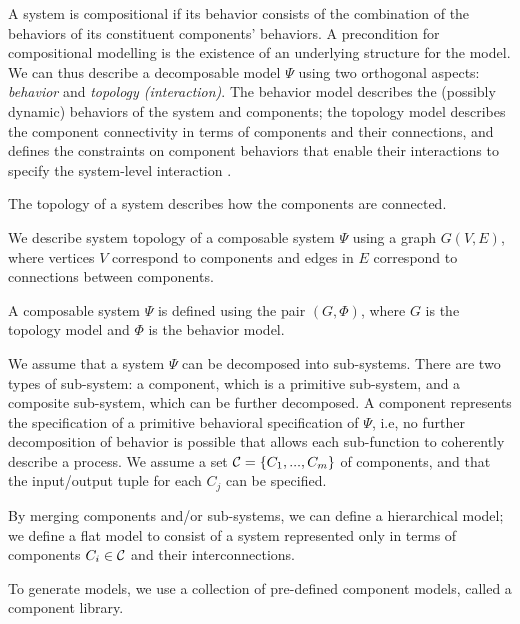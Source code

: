 A system is compositional if its behavior consists of the combination
of the behaviors of its constituent components' behaviors. A
precondition for compositional modelling is the existence of an
underlying structure for the model.  We can thus describe a
decomposable model $\Psi$ using two orthogonal aspects: {\em behavior}
and {\em topology (interaction)}. The behavior model describes the
(possibly dynamic) behaviors of the system and components; the
topology model describes the component connectivity in terms of
components and their connections, and defines the constraints on
component behaviors that enable their interactions to specify the
system-level interaction \cite{GosslerS05}.

The topology of a system describes how the components are connected.

\begin{definition}
%
We describe system topology of a composable system $\Psi$ using a
graph $G(V,E)$, where vertices $V$ correspond to components and edges
in $E$ correspond to connections between components.
%
\end{definition}

\begin{definition}
%
A composable system $\Psi$ is defined using the pair $(G,{\Phi})$,
where $G$ is the topology model and ${\Phi}$ is the behavior model.
%
\end{definition}

We assume that a system $\Psi$ can be decomposed into sub-systems.
There are two types of sub-system: a component, which is a primitive
sub-system, and a composite sub-system, which can be further
decomposed. A component represents the specification of a primitive
behavioral specification of $\Psi$, i.e, no further decomposition of
behavior is possible that allows each sub-function to coherently
describe a process. We assume a set ${\cal C}=\{C_1,...,C_m\}$ of
components, and that the input/output tuple for each $C_j$ can be
specified.


By merging components and/or sub-systems, we can define a hierarchical
model; we define a flat model to consist of a system represented only
in terms of components $C_i \in {\cal C}$ and their interconnections.

To generate models, we use a collection of pre-defined component models, called a 
component library.



